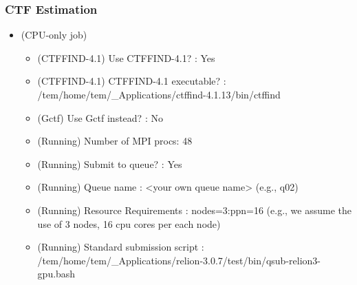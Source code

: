 \documentclass[letterpaper,10pt,english]{sphinxmanual}
\begin{document}
\subsubsection{CTF Estimation}
\label{\detokenize{relion:ctf-estimation}}\begin{itemize}
\item {} 
 (CPU-only job)
\begin{itemize}
\item {} 
(CTFFIND-4.1) Use CTFFIND-4.1? : Yes

\item {} 
(CTFFIND-4.1) CTFFIND-4.1 executable? : /tem/home/tem/\_Applications/ctffind-4.1.13/bin/ctffind

\item {} 
(Gctf) Use Gctf instead? : No

\item {} 
(Running) Number of MPI procs: 48

\item {} 
(Running) Submit to queue? : Yes

\item {} 
(Running) Queue name : \textless{}your own queue name\textgreater{} (e.g., q02)

\item {} 
(Running) Resource Requirements : nodes=3:ppn=16  (e.g., we assume the use of 3 nodes, 16 cpu cores per each node)

\item {} 
(Running) Standard submission script : /tem/home/tem/\_Applications/relion-3.0.7/test/bin/qsub-relion3-gpu.bash

\end{itemize}

\end{itemize}

\end{document}
